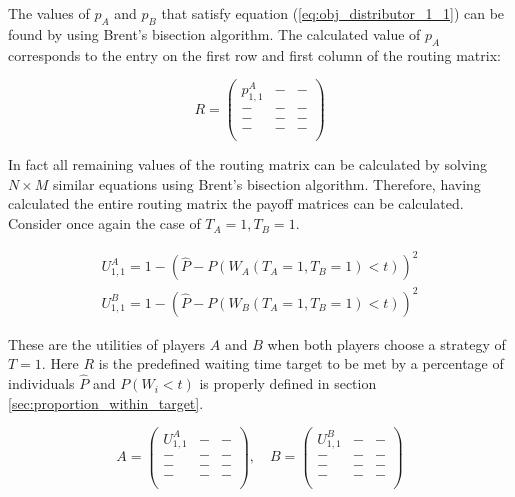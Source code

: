 The values of \(p_A\) and \(p_B\) that satisfy equation 
(\ref{eq:obj_distributor_1_1}) can be found by using Brent's bisection 
algorithm.
The calculated value of \(p_A\) corresponds to the entry on the first row and 
first column of the routing matrix:

\begin{equation}\label{eq:routing_matrix_1_1}
    R = 
    \begin{pmatrix}
        p_{1,1}^A & - & - \\
        - & - & - \\
        - & - & - \\
        - & - & - \\
    \end{pmatrix}
\end{equation}

In fact all remaining values of the routing matrix can be calculated by
solving \(N \times M\) similar equations using Brent's bisection algorithm.
Therefore, having calculated the entire routing matrix the payoff matrices can
be calculated.
Consider once again the case of \(T_A=1, T_B=1\). 


\begin{align}
    U_{1, 1}^A = 1 -\left( 
        \hat{P} - P(W_A(T_A=1, T_B=1) < t) 
    \right)^2 \nonumber
    \\
    U_{1, 1}^B = 1 -\left( 
        \hat{P} - P(W_B(T_A=1, T_B=1) < t) 
    \right)^2 \label{eq:payoff_entry_1_1}
\end{align}

These are the utilities of players \(A\) and \(B\) when both players choose a
strategy of \(T = 1\).
Here \(R\) is the predefined waiting time target to be met by a percentage of 
individuals \( \hat{P} \) and \(P(W_i < t)\) is properly defined in section
\ref{sec:proportion_within_target}.

\begin{equation}\label{eq:payoff_matrices_1_1}
    A = 
    \begin{pmatrix}
        U_{1, 1}^A & - & - \\
        - & - & - \\
        - & - & - \\
        - & - & - \\
    \end{pmatrix}, \quad
    B = 
    \begin{pmatrix}
        U_{1, 1}^B & - & - \\
        - & - & - \\
        - & - & - \\
        - & - & - \\
    \end{pmatrix}
\end{equation}

